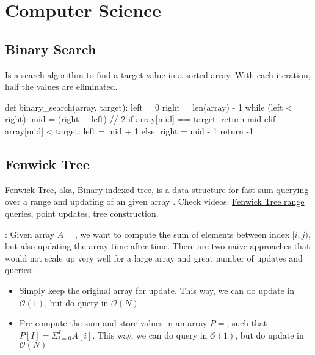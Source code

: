 \chapter{Computer Science}

\section{Binary Search}
Is a search algorithm to find a target value in a sorted array. With each iteration, half the values are eliminated.
\begin{python}
def binary_search(array, target):
	left = 0
	right = len(array) - 1
	while (left <= right):
		mid = (right + left) // 2		
		if array[mid] == target:
			return mid
		elif array[mid] < target: 
			left = mid + 1
		else:
			right = mid - 1	
	return -1
\end{python}
\section{Fenwick Tree}
Fenwick Tree, \ac{aka}, Binary indexed tree, is a data structure for fast sum querying over a range and updating of an given array \cite{fenwick1994new}. Check videos: \href{https://youtu.be/RgITNht_f4Q}{Fenwick Tree range queries}, \href{https://youtu.be/B-BkW9ZpKKM}{point updates}, \href{https://youtu.be/BHPez138yX8}{tree construction}.

\Eg: Given array $ A =  $, we want to compute the sum of elements between index $ [i, j) $, but also updating the array time after time. There are two naive approaches that would not scale up very well for a large array and great number of updates and queries:
\begin{itemize}
	\item Simply keep the original array for update. This way, we can do update in $ \mathcal{O}(1) $, but do query in $ \mathcal{O}(N) $
	\item Pre-compute the sum and store values in an array $ P =  $, such that $ \displaystyle P[I] = \Sigma^{I}_{i=0} A[i] $. This way, we can do query in $ \mathcal{O}(1) $, but do update in $ \mathcal{O}(N) $
\end{itemize}

